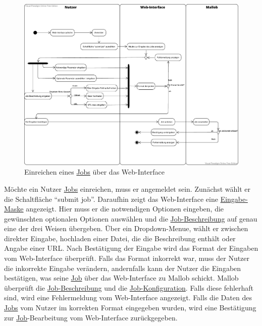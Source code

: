 \begin{figure}[H]
    \centering
    \includegraphics[width=\textwidth]{images-interface/v3_aktivitaetsdiagramme/Job_einreichen_v11.pdf}
    \caption{Einreichen eines \hyperref[B:Jobs]{Jobs} über das \gls{Web-Interface}}
\end{figure}
Möchte ein \gls{Nutzer} \hyperref[B:Jobs]{Jobs} einreichen, muss er angemeldet sein. Zunächst wählt er die Schaltfläche \enquote{submit job}. Daraufhin zeigt das \gls{Web-Interface} eine \hyperref[pages:submit-job]{Eingabe-Maske} angezeigt. Hier muss er die notwendigen Optionen eingeben, die gewünschten optionalen Optionen auswählen und die \hyperref[B:Job-Beschreibung]{Job-Beschreibung} auf genau eine der drei Weisen übergeben. Über ein \gls{Dropdown-Menue}, wählt er zwischen direkter Eingabe, hochladen einer Datei, die die Beschreibung enthält oder Angabe einer URL. Nach Bestätigung der Eingabe wird das Format der Eingaben vom \gls{Web-Interface} überprüft. Falls das Format inkorrekt war, muss der \gls{Nutzer} die inkorrekte Eingabe verändern, andernfalls kann der \gls{Nutzer} die Eingaben bestätigen, was seine \hyperref[B:Jobs]{Job} über das \gls{Web-Interface} zu Mallob schickt. Mallob überprüft die \hyperref[B:Job-Beschreibung]{Job-Beschreibung} und die \hyperref[B:Job-Konfiguration]{Job-Konfiguration}. Falls diese fehlerhaft sind, wird eine Fehlermeldung vom \gls{Web-Interface} angezeigt. Falls die Daten des \hyperref[B:Jobs]{Jobs} vom \gls{Nutzer} im korrekten Format eingegeben wurden, wird eine Bestätigung zur \hyperref[B:Jobs]{Job}-Bearbeitung vom \gls{Web-Interface} zurückgegeben.


